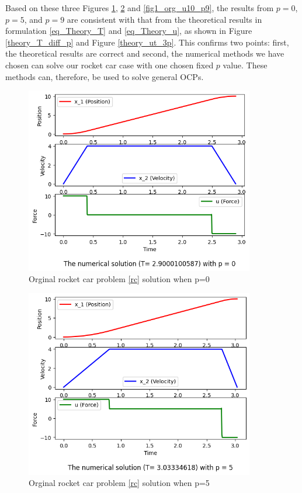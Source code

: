 \documentclass  [
  paper    = a4,
  BCOR     = 10mm,
  twoside,
  fontsize = 12pt,
  fleqn,
  toc      = bibnumbered,
  toc      = listofnumbered,
  numbers  = noendperiod,
  headings = normal,
  listof   = leveldown,
  version  = 3.03
]                                       {scrreprt}
\newcommand{\<}{\langle}
\renewcommand{\>}{\rangle}
\begin{document}
Based on these three Figures \ref{fig1_org_u10_p0},  \ref{fig1_org_u10_p5} and \ref{fig1_org_u10_p9}, the results from $p=0$,  $p=5$,  and $p=9$ are consistent with that from the theoretical results in formulation \ref{eq_Theory_T} and \ref{eq_Theory_u}, as shown in Figure \ref{theory_T_diff_p} and Figure \ref{theory_ut_3p}. This confirms two points: first, the theoretical results are correct and second, the numerical methods we have chosen can solve our rocket car case with one chosen fixed $p$ value. These methods can, therefore, be used to solve general OCPs.

\begin{figure}[H]
	\centerline{\includegraphics[width=10cm]{original_u10_p0.png}}
	\caption{Orginal rocket car problem \ref{rc} solution when p=0}
	\label{fig1_org_u10_p0}
\end{figure}

\begin{figure}[H]
	\centerline{\includegraphics[width=10cm]{original_u10_p5.png}}
	\caption{Orginal rocket car problem \ref{rc} solution when p=5}
	\label{fig1_org_u10_p5}
\end{figure}
\end{document}

